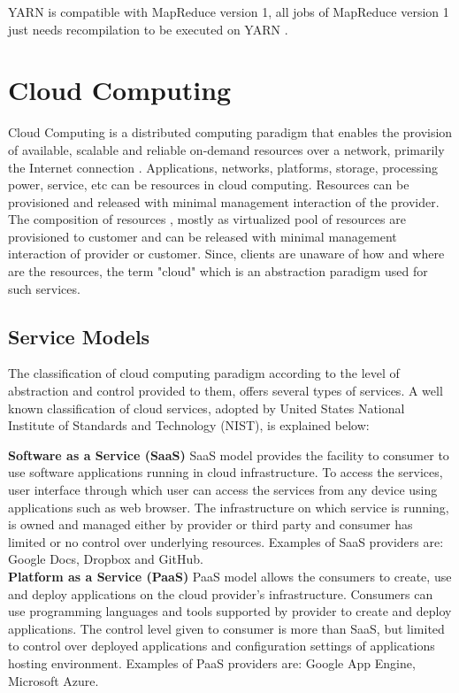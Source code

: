 YARN‌ is compatible with MapReduce version 1, all jobs of MapReduce version 1 just needs recompilation to be executed on YARN \cite{yarn}.   



  




\section{Cloud Computing}

 Cloud Computing is a distributed computing paradigm that enables the provision of available, scalable and reliable on-demand resources over a network, primarily the Internet connection \cite{nist}. Applications, networks, platforms, storage, processing power, service, etc can be resources in cloud computing. Resources can be provisioned and released with minimal management interaction of the provider. The composition of resources , mostly as virtualized pool of resources are provisioned to customer and can be released with minimal management interaction of provider or customer. Since, clients are unaware of how and where are the resources, the term "cloud" which is an abstraction paradigm used for such services. 

\subsection{Service Models}
  The classification of cloud computing paradigm according to the level of abstraction and control provided to them, offers several types of services. A well known classification of cloud services, adopted by United States National Institute of Standards and Technology (NIST)‌, is explained below: 


\textbf{Software as a Service (SaaS)} SaaS model provides the facility to consumer to use software applications running in cloud infrastructure. To access the services, user interface through which user can access the services from any device using applications such as web browser. The infrastructure on which service is running, is owned and managed either by provider or third party and consumer has limited or no control over underlying resources. Examples of SaaS providers are: Google Docs, Dropbox and GitHub. \\  


\textbf{Platform as a Service (PaaS)} PaaS model allows the consumers to create, use and deploy 
applications on the cloud provider's infrastructure. Consumers can use programming languages and tools supported by provider to create and deploy applications. The control level given to consumer is
 more than SaaS, but limited to control over deployed applications and configuration 
settings of applications hosting environment. Examples of PaaS providers are: Google App Engine, Microsoft Azure.\\    



